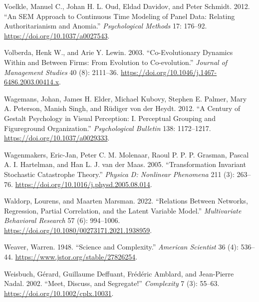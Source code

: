 \documentclass[
  letterpaper,
]{scrbook}
\newlength{\cslhangindent}
\newlength{\cslentryspacingunit} %
\newenvironment{CSLReferences}[2] %
 {%
  \setlength{\parindent}{0pt}
  \ifodd #1
  \let\oldpar\par
  \def\par{\hangindent=\cslhangindent\oldpar}
  \fi
  \setlength{\parskip}{#2\cslentryspacingunit}
 }%
 {}
\begin{document}
\begin{CSLReferences}{1}{0}
\leavevmode{}%
Voelkle, Manuel C., Johan H. L. Oud, Eldad Davidov, and Peter Schmidt.
2012. {``An {SEM} Approach to Continuous Time Modeling of Panel Data:
{Relating} Authoritarianism and Anomia.''} \emph{Psychological Methods}
17: 176--92. \url{https://doi.org/10.1037/a0027543}.

\leavevmode{}%
Volberda, Henk W., and Arie Y. Lewin. 2003. {``Co-Evolutionary {Dynamics
Within} and {Between Firms}: {From Evolution} to {Co-evolution}.''}
\emph{Journal of Management Studies} 40 (8): 2111--36.
\url{https://doi.org/10.1046/j.1467-6486.2003.00414.x}.

\leavevmode{}%
Wagemans, Johan, James H. Elder, Michael Kubovy, Stephen E. Palmer, Mary
A. Peterson, Manish Singh, and Rüdiger von der Heydt. 2012. {``A Century
of {Gestalt} Psychology in Visual Perception: {I}. {Perceptual} Grouping
and Figure\textendash ground Organization.''} \emph{Psychological
Bulletin} 138: 1172--1217. \url{https://doi.org/10.1037/a0029333}.

\leavevmode{}%
Wagenmakers, Eric-Jan, Peter C. M. Molenaar, Raoul P. P. P. Grasman,
Pascal A. I. Hartelman, and Han L. J. van der Maas. 2005.
{``Transformation Invariant Stochastic Catastrophe Theory.''}
\emph{Physica D: Nonlinear Phenomena} 211 (3): 263--76.
\url{https://doi.org/10.1016/j.physd.2005.08.014}.

\leavevmode{}%
Waldorp, Lourens, and Maarten Marsman. 2022. {``Relations Between
{Networks}, {Regression}, {Partial Correlation}, and the {Latent
Variable Model}.''} \emph{Multivariate Behavioral Research} 57 (6):
994--1006. \url{https://doi.org/10.1080/00273171.2021.1938959}.

\leavevmode{}%
Weaver, Warren. 1948. {``Science and {Complexity}.''} \emph{American
Scientist} 36 (4): 536--44. \url{https://www.jstor.org/stable/27826254}.

\leavevmode{}%
Weisbuch, Gérard, Guillaume Deffuant, Frédéric Amblard, and Jean-Pierre
Nadal. 2002. {``Meet, Discuss, and Segregate!''} \emph{Complexity} 7
(3): 55--63. \url{https://doi.org/10.1002/cplx.10031}.


\end{CSLReferences}
\end{document}
